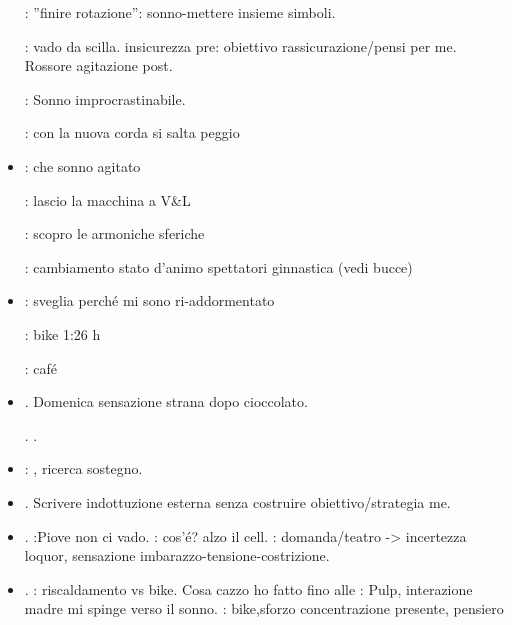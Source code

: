 \begin{itemize}
: ''finire rotazione'': sonno-mettere insieme simboli.

: vado da scilla. insicurezza pre: obiettivo rassicurazione/pensi per me. Rossore agitazione post.

: Sonno improcrastinabile.

: con la nuova corda si salta peggio

\item {}

: che sonno agitato

: lascio la macchina a V\&L

: scopro le armoniche sferiche

: cambiamento stato d'animo spettatori ginnastica (vedi bucce)

\item {}

: sveglia perch\'e mi sono ri-addormentato

: bike 1:26 h

: caf\'e

\item {}.
Domenica sensazione strana dopo cioccolato.

. .

\item {}: , ricerca sostegno.

\item {}. Scrivere indottuzione esterna senza costruire obiettivo/strategia me.

\item {}. :Piove non ci vado. : cos'\'e? alzo il cell. : domanda/teatro -> incertezza loquor, sensazione imbarazzo-tensione-costrizione.

\item {}. : riscaldamento vs bike. Cosa cazzo ho fatto fino alle : Pulp, interazione madre mi spinge verso il sonno. : bike,sforzo concentrazione presente, pensiero 


\end{itemize}
